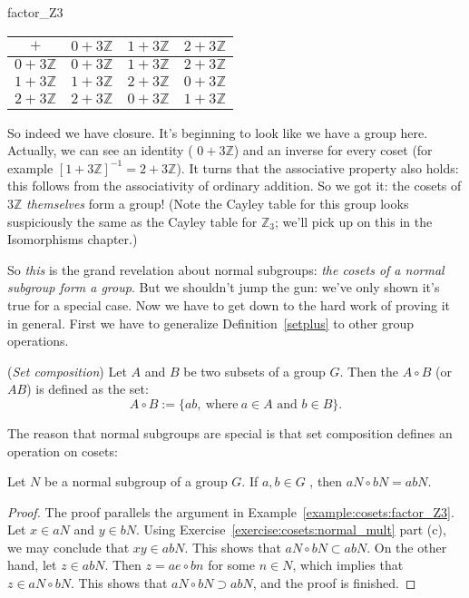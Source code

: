 {\begin{example}{factor_Z3}
\begin{center}
\begin{tabular}{c|ccc}
$+$             & $0 + 3{\mathbb Z}$ & $1 + 3{\mathbb Z}$ & $2 + 3{\mathbb Z}$ \\\hline
$0 + 3{\mathbb Z}$ & $0 + 3{\mathbb Z}$ & $1 + 3{\mathbb Z}$ & $2 + 3{\mathbb Z}$ \\
$1 + 3{\mathbb Z}$ & $1 + 3{\mathbb Z}$ & $2 + 3{\mathbb Z}$ & $0 + 3{\mathbb Z}$ \\
$2 + 3{\mathbb Z}$ & $2 + 3{\mathbb Z}$ & $0 + 3{\mathbb Z}$ & $1 + 3{\mathbb Z}$
\end{tabular}
\end{center}

So indeed we have closure.  It's beginning to look like we have a group here. Actually,  we can see an identity ( $0 + 3 {\mathbb Z}$) and an inverse for every coset (for example $[1 + 3 {\mathbb Z}]^{-1}=2 + 3 {\mathbb Z}$). It turns that the associative property also holds: this follows from the associativity of ordinary addition. So we got it: the cosets of $3 {\mathbb Z}$ \emph{themselves} form a group!  (Note the Cayley table for this group looks suspiciously the same as the Cayley table for ${\mathbb Z}_3$; we'll pick up on this in the Isomorphisms chapter.)  
\end{example}

 So \emph{this} is the grand revelation about normal subgroups: \emph{the cosets of a normal subgroup form a group}. But we shouldn't jump the gun: we've only shown it's true for a special case. Now we have to get down to the hard work of proving it in general. First we have to generalize Definition~\ref{setplus} to other group operations.

\begin{defn}\label{setcomp}(\emph{Set composition})  Let $A$ and $B$ be two subsets of a group $G$.  Then the  $A \circ B$ (or $AB$)  is defined as the set:
\[ A \circ B := \{a b, \mathrm{~where~} a \in A \text{ and } b \in B\} .\]
\end{defn}

The reason that normal subgroups are special is that set composition defines an operation on cosets:

\begin{thm}\label{norm_comp}
Let $N$ be a normal subgroup of a group $G$. If $a,b \in G$ , then $aN \circ bN = abN$.
\end{thm}
\begin{proof}
The proof parallels the argument in Example~\ref{example:cosets:factor_Z3}. Let $x \in aN$ and $y \in bN$. 
Using Exercise~\ref{exercise:cosets:normal_mult} part (c), we may conclude that $xy \in abN$.  This shows that $aN \circ bN \subset abN$.  On the other hand,
let $z \in abN$.  Then $z = ae \circ b  n$ for some $n\in N$, which implies that $z \in aN \circ bN$.  This shows that $aN \circ bN \supset abN$, and the proof is finished.
\end{proof}

}
